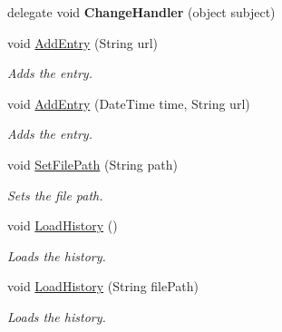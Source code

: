 \begin{DoxyCompactItemize}
\item 
\hypertarget{class_assessment___two___logic_1_1_model_1_1_history_handler_ad176deacdc56461600bdd42a7eb5256e}{
delegate void {\bfseries ChangeHandler} (object subject)}
\label{class_assessment___two___logic_1_1_model_1_1_history_handler_ad176deacdc56461600bdd42a7eb5256e}

\item 
void \hyperlink{class_assessment___two___logic_1_1_model_1_1_history_handler_a0a13a50de993d05c8bd9e158deb5cced}{AddEntry} (String url)
\begin{DoxyCompactList}\small\item\em Adds the entry. \item\end{DoxyCompactList}\item 
void \hyperlink{class_assessment___two___logic_1_1_model_1_1_history_handler_af60b3706e59ff617286816a3054bdf5a}{AddEntry} (DateTime time, String url)
\begin{DoxyCompactList}\small\item\em Adds the entry. \item\end{DoxyCompactList}\item 
void \hyperlink{class_assessment___two___logic_1_1_model_1_1_history_handler_a547077e4f1fdd12e9d034e2078ec8136}{SetFilePath} (String path)
\begin{DoxyCompactList}\small\item\em Sets the file path. \item\end{DoxyCompactList}\item 
void \hyperlink{class_assessment___two___logic_1_1_model_1_1_history_handler_ab30f5aa9575a7996272b943dcbfdc8d5}{LoadHistory} ()
\begin{DoxyCompactList}\small\item\em Loads the history. \item\end{DoxyCompactList}\item 
void \hyperlink{class_assessment___two___logic_1_1_model_1_1_history_handler_a5d20f4908a83201091737c2df1a86eda}{LoadHistory} (String filePath)
\begin{DoxyCompactList}\small\item\em Loads the history. \item\end{DoxyCompactList}\item 

\end{DoxyCompactItemize}
